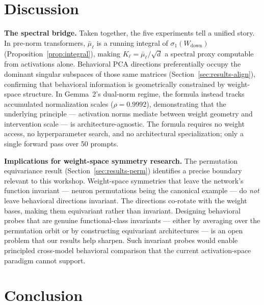 \documentclass{article}
\newcommand{\mubar}{\bar{\mu}}
\newcommand{\sone}{\sigma_1}
\newcommand{\Wdn}{W_{\!\mathrm{down}}}
\begin{document}
\section{Discussion}
\label{sec:discussion}

\textbf{The spectral bridge.}
Taken together, the five experiments tell a unified story.
In pre-norm transformers, $\mubar_\ell$ is a running integral of $\sone(\Wdn)$
(Proposition~\ref{prop:integral}), making $K_\ell = \mubar_\ell/\!\sqrt{d}$ a
spectral proxy computable from activations alone.
Behavioral PCA directions preferentially occupy the dominant singular subspaces of those
same matrices (Section~\ref{sec:results-align}), confirming that behavioral information
is geometrically constrained by weight-space structure.
In Gemma~2's dual-norm regime, the formula instead tracks accumulated normalization
scales ($\rho{=}0.9992$), demonstrating that the underlying principle — activation norms
mediate between weight geometry and intervention scale — is architecture-agnostic.
The formula requires no weight access, no hyperparameter search, and no architectural
specialization; only a single forward pass over 50 prompts.

\textbf{Implications for weight-space symmetry research.}
The permutation equivariance result (Section~\ref{sec:results-perm}) identifies a
precise boundary relevant to this workshop.
Weight-space symmetries that leave the network's function invariant — neuron permutations
being the canonical example — do \emph{not} leave behavioral directions invariant.
The directions co-rotate with the weight bases, making them equivariant rather than
invariant.
Designing behavioral probes that are genuine functional-class invariants — either by
averaging over the permutation orbit or by constructing equivariant architectures —
is an open problem that our results help sharpen.
Such invariant probes would enable principled cross-model behavioral comparison that
the current activation-space paradigm cannot support.

\section{Conclusion}
\label{sec:conclusion}
\end{document}
